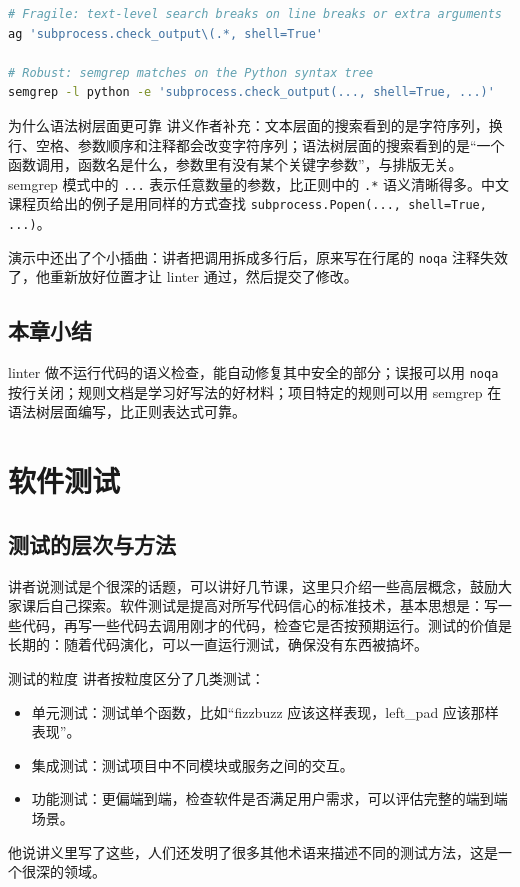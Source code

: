 \documentclass[a4paper]{article}
\begin{document}
\begin{lstlisting}[language=bash]
# Fragile: text-level search breaks on line breaks or extra arguments
ag 'subprocess.check_output\(.*, shell=True'

# Robust: semgrep matches on the Python syntax tree
semgrep -l python -e 'subprocess.check_output(..., shell=True, ...)'
\end{lstlisting}

\begin{knowledgebox}{为什么语法树层面更可靠}
讲义作者补充：文本层面的搜索看到的是字符序列，换行、空格、参数顺序和注释都会改变字符序列；语法树层面的搜索看到的是“一个函数调用，函数名是什么，参数里有没有某个关键字参数”，与排版无关。semgrep 模式中的 \texttt{...} 表示任意数量的参数，比正则中的 \texttt{.*} 语义清晰得多。中文课程页给出的例子是用同样的方式查找 \texttt{subprocess.Popen(..., shell=True, ...)}。
\end{knowledgebox}

演示中还出了个小插曲：讲者把调用拆成多行后，原来写在行尾的 \texttt{noqa} 注释失效了，他重新放好位置才让 linter 通过，然后提交了修改。

\subsection{本章小结}

linter 做不运行代码的语义检查，能自动修复其中安全的部分；误报可以用 \texttt{noqa} 按行关闭；规则文档是学习好写法的好材料；项目特定的规则可以用 semgrep 在语法树层面编写，比正则表达式可靠。

\section{软件测试}

\subsection{测试的层次与方法}

讲者说测试是个很深的话题，可以讲好几节课，这里只介绍一些高层概念，鼓励大家课后自己探索。软件测试是提高对所写代码信心的标准技术，基本思想是：写一些代码，再写一些代码去调用刚才的代码，检查它是否按预期运行。测试的价值是长期的：随着代码演化，可以一直运行测试，确保没有东西被搞坏。

\begin{knowledgebox}{测试的粒度}
讲者按粒度区分了几类测试：
\begin{itemize}
\item 单元测试：测试单个函数，比如“fizzbuzz 应该这样表现，left\_pad 应该那样表现”。
\item 集成测试：测试项目中不同模块或服务之间的交互。
\item 功能测试：更偏端到端，检查软件是否满足用户需求，可以评估完整的端到端场景。
\end{itemize}
他说讲义里写了这些，人们还发明了很多其他术语来描述不同的测试方法，这是一个很深的领域。
\end{knowledgebox}
\end{document}
